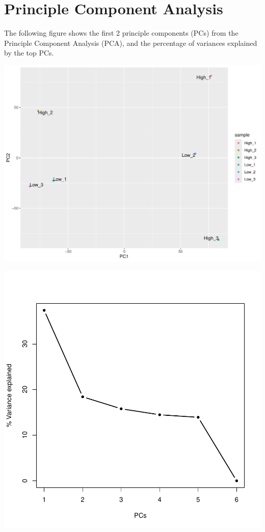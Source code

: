\documentclass{article}
\begin{document}
\newpage\section{Principle Component Analysis}
The following figure shows the first 2 principle components (PCs) from the Principle Component Analysis (PCA), and the percentage of variances explained by the top PCs.



\includegraphics{all_countsummary-007}

\includegraphics{all_countsummary-008}
\end{document}
